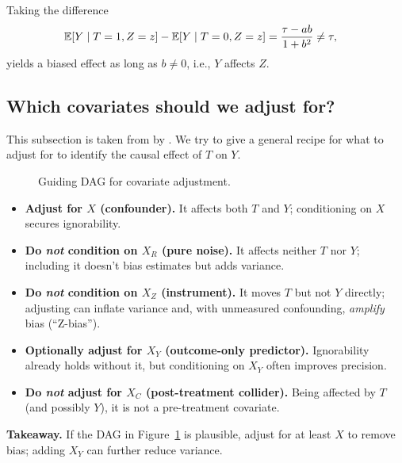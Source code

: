 \documentclass[11pt]{exam}
\begin{document}
\noindent
Taking the difference
\begin{align*}
    \mathbb{E}[Y \mid T = 1, Z = z] - \mathbb{E}[Y \mid T = 0, Z = z] &= \frac{\tau - ab}{1 + b^2} \neq \tau,
\end{align*}
yields a biased effect as long as $b \neq 0$, i.e., $Y$ affects $Z$.


\subsection{Which covariates should we adjust for?}
This subsection is taken from by \citet[Chapter~16.3.3]{ding2023coursecausalinference}. We try to give a general recipe for what to adjust for to identify the causal effect of $T$ on $Y$.

\begin{figure}[h!]
\centering
{}
\caption{Guiding DAG for covariate adjustment.}
\label{fig:adj_which}
\end{figure}

\begin{itemize}
  \item \textbf{Adjust for $X$ (confounder).} It affects both $T$ and $Y$; conditioning on $X$ secures ignorability.
  \item \textbf{Do \emph{not} condition on $X_R$ (pure noise).} It affects neither $T$ nor $Y$; including it doesn’t bias estimates but adds variance.
  \item \textbf{Do \emph{not} condition on $X_Z$ (instrument).} It moves $T$ but not $Y$ directly; adjusting can inflate variance and, with unmeasured confounding, \emph{amplify} bias (``Z-bias''). 
  \item \textbf{Optionally adjust for $X_Y$ (outcome-only predictor).} Ignorability already holds without it, but conditioning on $X_Y$ often improves precision. 
  \item \textbf{Do \emph{not} adjust for $X_C$ (post-treatment collider).} Being affected by $T$ (and possibly $Y$), it is not a pre-treatment covariate.
\end{itemize}

\noindent\textbf{Takeaway.} If the DAG in Figure~\ref{fig:adj_which} is plausible, adjust for at least $X$ to remove bias; adding $X_Y$ can further reduce variance.  



\endgroup

\newpage


\end{document}
